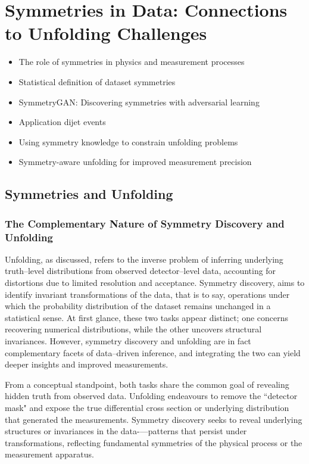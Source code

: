 \chapter{Symmetries in Data: Connections to Unfolding Challenges}
\label{chap:symmetrygan}
\begin{itemize}
    \item The role of symmetries in physics and measurement processes
    \item Statistical definition of dataset symmetries
    \item SymmetryGAN: Discovering symmetries with adversarial learning
    \item Application dijet events
    \item Using symmetry knowledge to constrain unfolding problems
    \item Symmetry-aware unfolding for improved measurement precision
\end{itemize}
\section{Symmetries and Unfolding}
    \subsection{The Complementary Nature of Symmetry Discovery and Unfolding}
        Unfolding, as discussed, refers to the inverse problem of inferring underlying truth--level distributions from observed detector--level data, accounting for distortions due to limited resolution and acceptance.
        Symmetry discovery, aims to identify invariant transformations of the data, that is to say, operations under which the probability distribution of the dataset remains unchanged in a statistical sense.
        At first glance, these two tasks appear distinct;
        one concerns recovering numerical distributions, while the other uncovers structural invariances.
        However, symmetry discovery and unfolding are in fact complementary facets of data--driven inference, and integrating the two can yield deeper insights and improved measurements.
    
        From a conceptual standpoint, both tasks share the common goal of revealing hidden truth from observed data.
        Unfolding endeavours to remove the ``detector mask" and expose the true differential cross section or underlying distribution that generated the measurements.
        Symmetry discovery seeks to reveal underlying structures or invariances in the data-—patterns that persist under transformations, reflecting fundamental symmetries of the physical process or the measurement apparatus.
    
